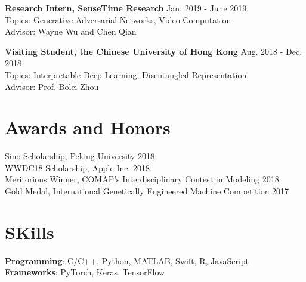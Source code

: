 \documentclass{academiccv}
\begin{document}
\textbf{Research Intern, SenseTime Research} \hfill Jan. 2019 - June 2019  \\
Topics: Generative Adversarial Networks, Video Computation \\
Advisor: Wayne Wu and Chen Qian \newline

\textbf{Visiting Student, the Chinese University of Hong Kong} \hfill Aug. 2018 - Dec. 2018  \\
Topics: Interpretable Deep Learning, Disentangled Representation \\
Advisor: Prof. Bolei Zhou \\

\section*{Awards and Honors}


Sino Scholarship, Peking University \hfill 2018  \\
WWDC18 Scholarship, Apple Inc. \hfill 2018  \\
Meritorious Winner, COMAP's Interdisciplinary Contest in Modeling \hfill 2018  \\
Gold Medal, International Genetically Engineered Machine Competition 
\hfill 2017  \\


\section*{SKills}
\textbf{Programming}: C/C++, Python, MATLAB, Swift, R, JavaScript\\
\textbf{Frameworks}: PyTorch, Keras, TensorFlow\\


\end{document}
